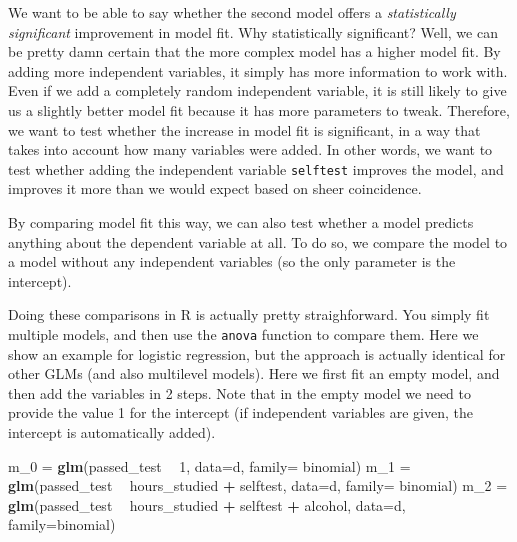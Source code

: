 \documentclass[
]{article}
\newenvironment{Shaded}{\begin{snugshade}}{\end{snugshade}}
\newcommand{\DataTypeTok}[1]{\textcolor[rgb]{0.13,0.29,0.53}{#1}}
\newcommand{\DecValTok}[1]{\textcolor[rgb]{0.00,0.00,0.81}{#1}}
\newcommand{\KeywordTok}[1]{\textcolor[rgb]{0.13,0.29,0.53}{\textbf{#1}}}
\newcommand{\NormalTok}[1]{#1}
\newcommand{\OperatorTok}[1]{\textcolor[rgb]{0.81,0.36,0.00}{\textbf{#1}}}
\newcommand{\StringTok}[1]{\textcolor[rgb]{0.31,0.60,0.02}{#1}}
\begin{document}
We want to be able to say whether the second model offers a
\emph{statistically significant} improvement in model fit. Why
statistically significant? Well, we can be pretty damn certain that the
more complex model has a higher model fit. By adding more independent
variables, it simply has more information to work with. Even if we add a
completely random independent variable, it is still likely to give us a
slightly better model fit because it has more parameters to tweak.
Therefore, we want to test whether the increase in model fit is
significant, in a way that takes into account how many variables were
added. In other words, we want to test whether adding the independent
variable \texttt{selftest} improves the model, and improves it more than
we would expect based on sheer coincidence.

By comparing model fit this way, we can also test whether a model
predicts anything about the dependent variable at all. To do so, we
compare the model to a model without any independent variables (so the
only parameter is the intercept).

Doing these comparisons in R is actually pretty straighforward. You
simply fit multiple models, and then use the \texttt{anova} function to
compare them. Here we show an example for logistic regression, but the
approach is actually identical for other GLMs (and also multilevel
models). Here we first fit an empty model, and then add the variables in
2 steps. Note that in the empty model we need to provide the value 1 for
the intercept (if independent variables are given, the intercept is
automatically added).

\begin{Shaded}
\begin{Highlighting}[]
\NormalTok{m_}\DecValTok{0}\NormalTok{ =}\StringTok{ }\KeywordTok{glm}\NormalTok{(passed_test }\OperatorTok{~}\StringTok{ }\DecValTok{1}\NormalTok{, }\DataTypeTok{data=}\NormalTok{d, }\DataTypeTok{family=}\NormalTok{ binomial)}
\NormalTok{m_}\DecValTok{1}\NormalTok{ =}\StringTok{ }\KeywordTok{glm}\NormalTok{(passed_test }\OperatorTok{~}\StringTok{ }\NormalTok{hours_studied }\OperatorTok{+}\StringTok{ }\NormalTok{selftest, }\DataTypeTok{data=}\NormalTok{d, }\DataTypeTok{family=}\NormalTok{ binomial)}
\NormalTok{m_}\DecValTok{2}\NormalTok{ =}\StringTok{ }\KeywordTok{glm}\NormalTok{(passed_test }\OperatorTok{~}\StringTok{ }\NormalTok{hours_studied }\OperatorTok{+}\StringTok{ }\NormalTok{selftest }\OperatorTok{+}\StringTok{ }\NormalTok{alcohol, }\DataTypeTok{data=}\NormalTok{d, }\DataTypeTok{family=}\NormalTok{binomial)}
\end{Highlighting}
\end{Shaded}
\end{document}
